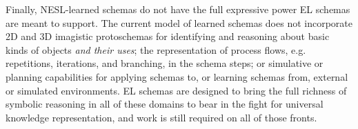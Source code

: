 Finally, NESL-learned schemas do not have the full expressive power EL schemas are meant to support. The current model of learned schemas does not incorporate 2D and 3D imagistic protoschemas for identifying and reasoning about basic kinds of objects \textit{and their uses}; the representation of process flows, e.g. repetitions, iterations, and branching, in the schema steps; or simulative or planning capabilities for applying schemas to, or learning schemas from, external or simulated environments. EL schemas are designed to bring the full richness of symbolic reasoning in all of these domains to bear in the fight for universal knowledge representation, and work is still required on all of those fronts.